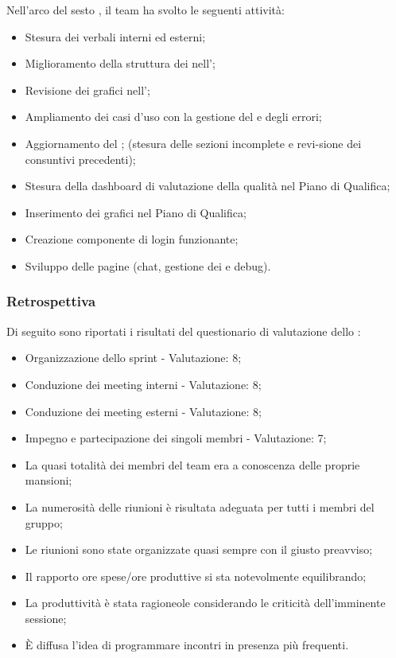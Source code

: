 Nell'arco del sesto , il team ha svolto le seguenti attività:
\begin{itemize}
    \item Stesura dei verbali interni ed esterni;
    \item Miglioramento della struttura dei  nell’\AdR;
    \item Revisione dei grafici nell’\AdR;
    \item Ampliamento dei casi d’uso con la gestione del  e degli errori;
    \item Aggiornamento del \PdP; (stesura delle sezioni incomplete e revi-sione dei consuntivi precedenti);
    \item Stesura della dashboard di valutazione della qualità nel Piano di Qualifica;
    \item Inserimento dei grafici nel Piano di Qualifica;
    \item Creazione componente di login funzionante;
    \item Sviluppo delle pagine  (chat, gestione dei  e debug).
\end{itemize}

\subsubsection{Retrospettiva}

\par Di seguito sono riportati i risultati del questionario di valutazione dello :
\begin{itemize}
  \item Organizzazione dello sprint - Valutazione: 8;
  \item Conduzione dei meeting interni - Valutazione: 8;
  \item Conduzione dei meeting esterni - Valutazione: 8;
  \item Impegno e partecipazione dei singoli membri - Valutazione: 7;
  \item La quasi totalità dei membri del team era a conoscenza delle proprie mansioni;
  \item La numerosità delle riunioni è risultata adeguata per tutti i membri del gruppo;
  \item Le riunioni sono state organizzate quasi sempre con il giusto preavviso;
  \item Il rapporto ore spese/ore produttive si sta notevolmente equilibrando;
  \item La produttività è stata ragioneole considerando le criticità dell'imminente sessione;
  \item È diffusa l'idea di programmare incontri in presenza più frequenti.
\end{itemize}

